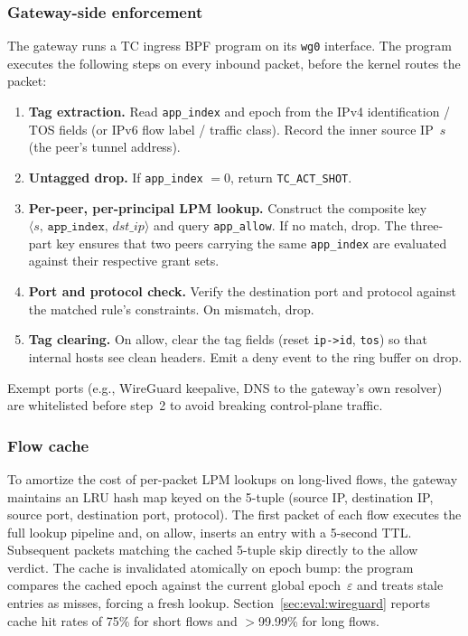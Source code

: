 \documentclass[sigconf]{acmart}
\begin{document}
\subsubsection{Gateway-side enforcement}

The gateway runs a TC ingress BPF program on its \texttt{wg0}
interface.  The program executes the following steps on every
inbound packet, before the kernel routes the packet:
\begin{enumerate}
  \item \textbf{Tag extraction.}
    Read \texttt{app\_index} and epoch from the IPv4 identification
    / TOS fields (or IPv6 flow label / traffic class).
    Record the inner source IP~$s$ (the peer's tunnel address).
  \item \textbf{Untagged drop.}
    If \texttt{app\_index} $= 0$, return \texttt{TC\_ACT\_SHOT}.
  \item \textbf{Per-peer, per-principal LPM lookup.}
    Construct the composite key
    $\langle s,\, \texttt{app\_index},\, \mathit{dst\_ip} \rangle$
    and query \texttt{app\_allow}.  If no match, drop.
    The three-part key ensures that two peers carrying the same
    \texttt{app\_index} are evaluated against their respective
    grant sets.
  \item \textbf{Port and protocol check.}
    Verify the destination port and protocol against the matched
    rule's constraints.  On mismatch, drop.
  \item \textbf{Tag clearing.}
    On allow, clear the tag fields (reset \texttt{ip->id},
    \texttt{tos}) so that internal hosts see clean headers.
    Emit a deny event to the ring buffer on drop.
\end{enumerate}
Exempt ports (e.g., WireGuard keepalive, DNS to the gateway's
own resolver) are whitelisted before step~2 to avoid breaking
control-plane traffic.

\subsubsection{Flow cache}

To amortize the cost of per-packet LPM lookups on long-lived
flows, the gateway maintains an LRU hash map keyed on the 5-tuple
(source IP, destination IP, source port, destination port,
protocol).
The first packet of each flow executes the full lookup pipeline
and, on allow, inserts an entry with a 5-second TTL.
Subsequent packets matching the cached 5-tuple skip directly to
the allow verdict.
The cache is invalidated atomically on epoch bump: the program
compares the cached epoch against the current global
epoch~$\varepsilon$ and treats stale entries as misses,
forcing a fresh lookup.
Section~\ref{sec:eval:wireguard} reports cache hit rates of 75\%
for short flows and $>$99.99\% for long flows.
\end{document}
